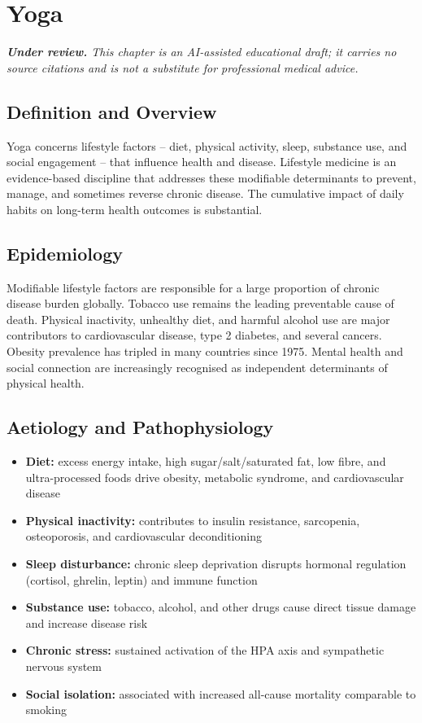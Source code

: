 \chapter{Yoga}

\medskip
\noindent\textit{\textbf{Under review.} This chapter is an AI-assisted educational draft; it carries no source citations and is not a substitute for professional medical advice.}

\section*{Definition and Overview}
Yoga concerns lifestyle factors -- diet, physical activity, sleep, substance use, and social engagement -- that influence health and disease. Lifestyle medicine is an evidence-based discipline that addresses these modifiable determinants to prevent, manage, and sometimes reverse chronic disease. The cumulative impact of daily habits on long-term health outcomes is substantial.

\section*{Epidemiology}
Modifiable lifestyle factors are responsible for a large proportion of chronic disease burden globally. Tobacco use remains the leading preventable cause of death. Physical inactivity, unhealthy diet, and harmful alcohol use are major contributors to cardiovascular disease, type 2 diabetes, and several cancers. Obesity prevalence has tripled in many countries since 1975. Mental health and social connection are increasingly recognised as independent determinants of physical health.

\section*{Aetiology and Pathophysiology}
\begin{itemize}
    \item \textbf{Diet:} excess energy intake, high sugar/salt/saturated fat, low fibre, and ultra-processed foods drive obesity, metabolic syndrome, and cardiovascular disease
    \item \textbf{Physical inactivity:} contributes to insulin resistance, sarcopenia, osteoporosis, and cardiovascular deconditioning
    \item \textbf{Sleep disturbance:} chronic sleep deprivation disrupts hormonal regulation (cortisol, ghrelin, leptin) and immune function
    \item \textbf{Substance use:} tobacco, alcohol, and other drugs cause direct tissue damage and increase disease risk
    \item \textbf{Chronic stress:} sustained activation of the HPA axis and sympathetic nervous system
    \item \textbf{Social isolation:} associated with increased all-cause mortality comparable to smoking
\end{itemize}

